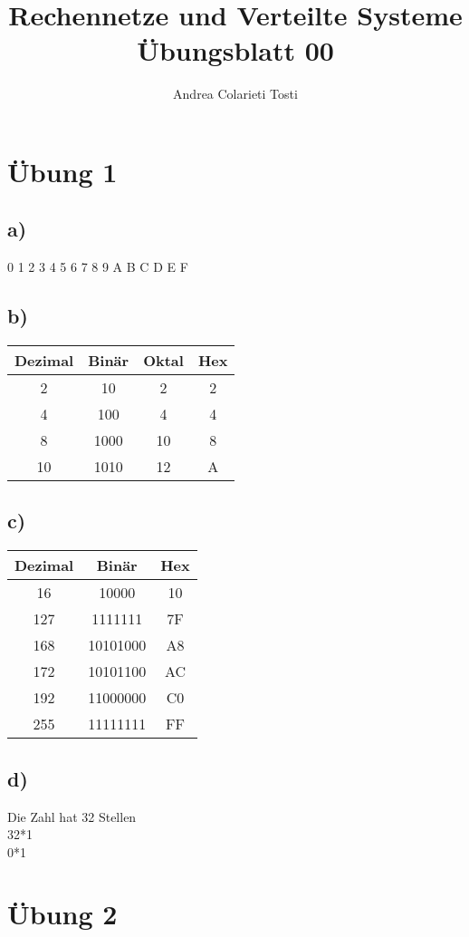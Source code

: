 \documentclass[12pt,a4paper]{article}
\author{Andrea Colarieti Tosti}
\title{Rechennetze und Verteilte Systeme Übungsblatt 00}
\begin{document}
\maketitle
\section*{Übung 1}
\subsection*{a)}
0 1 2 3 4 5 6 7 8 9 A B C D E F 
\subsection*{b)}
\begin{center}
 \begin{tabular}{|c | c | c | c |} 
 \hline
 Dezimal & Binär & Oktal & Hex \\ [0.5ex] 
 \hline
 2 & 10 & 2 & 2 \\ 
 \hline
 4 & 100 & 4 & 4 \\
 \hline
 8 & 1000 & 10 & 8 \\
 \hline
 10 & 1010 & 12 & A \\
 \hline
\end{tabular}
\end{center}
\subsection*{c)}
\begin{center}
 \begin{tabular}{|c | c | c | } 
 \hline
 Dezimal & Binär & Hex \\ [0.5ex] 
 \hline
 16 & 10000 & 10 \\ 
 \hline
 127 & 1111111 & 7F \\
 \hline
 168 & 10101000 & A8 \\
 \hline
 172 & 10101100 & AC \\
 \hline
 192 & 11000000 & C0 \\
 \hline
 255 &  11111111 & FF \\
 \hline
\end{tabular}
\end{center}\newpage
\subsection*{d)}
Die Zahl hat 32 Stellen \\
32*1\\0*1
\section*{Übung 2}
\end{document}

